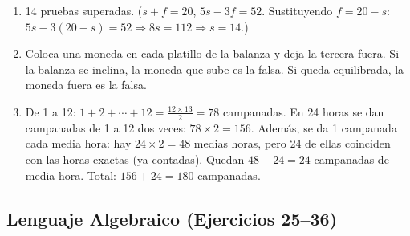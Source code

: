 \documentclass[12pt, letterpaper]{article}
\begin{document}
\begin{enumerate}[leftmargin=*, label=\textbf{\arabic*.}]
    \item 14 pruebas superadas. ($s + f = 20$, $5s - 3f = 52$. Sustituyendo $f = 20 - s$: $5s - 3(20 - s) = 52 \Rightarrow 8s = 112 \Rightarrow s = 14$.)

    \item Coloca una moneda en cada platillo de la balanza y deja la tercera fuera. Si la balanza se inclina, la moneda que sube es la falsa. Si queda equilibrada, la moneda fuera es la falsa.

    \item De 1 a 12: $1 + 2 + \cdots + 12 = \frac{12 \times 13}{2} = 78$ campanadas. En 24 horas se dan campanadas de 1 a 12 dos veces: $78 \times 2 = 156$. Además, se da 1 campanada cada media hora: hay $24 \times 2 = 48$ medias horas, pero 24 de ellas coinciden con las horas exactas (ya contadas). Quedan $48 - 24 = 24$ campanadas de media hora. Total: $156 + 24 = 180$ campanadas.
  \end{enumerate}

  \subsection*{Lenguaje Algebraico (Ejercicios 25--36)}
\end{document}
